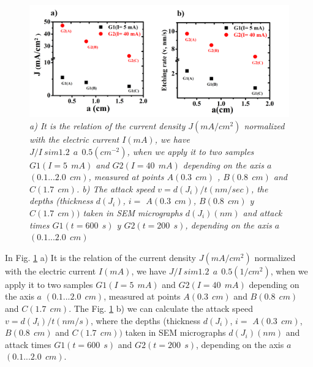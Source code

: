 \documentclass{article}
\begin{document}
 \begin{figure}
   \centering
   \includegraphics[scale=.7]{Images/grinJDR}
   \caption{\emph{a) It is the relation of the current density $
       J (mA / cm ^ 2) $ normalized with the electric current $ I
       (mA) $, we have $ J / I \ sim 1.2 \ \ a \ \ 0.5 ( cm^{-2})
       $, when we apply it to two samples $ G1 (I = 5 \ \ mA) $
       and $ G2 (I = 40 \ \ mA) $ depending on the axis $ a $ $
       (0.1 ... 2.0 \ \ cm) $, measured at points $ A (0.3 \ \
       cm) $ , $ B (0.8 \ \ cm) $ and $ C (1.7 \ \ cm) $. b) The
       attack speed $ v = d (J_i) / t (nm / sec) $, the depths
       (thickness $ d (J_i) $, $ i = $ $ A (0.3 \ \ cm) $, $ B (
       0.8 \ \ cm) $ y $ C (1.7 \ \ cm)) $ taken in SEM
       micrographs $ d (J_i) (nm) $ and attack times $ G1 (t =
       600 \ \ s) $ y $ G2 (t = 200 \ \ s) $, depending on the
       axis $ a $ $ (0.1 ... 2.0 \ \ cm) $ } }
   \label{fig:JDR}
 \end{figure}
In Fig. \ref{fig:JDR} a) It is the relation of the current density $ J
(mA / cm ^ 2) $ normalized with the electric current $ I (mA) $, we
have $ J / I \ sim 1.2 \ \ a \ \ 0.5 (1 / cm ^ 2) $, when we apply it
to two samples $ G1 (I = 5 \ \ mA) $ and $ G2 (I = 40 \ \ mA) $
depending on the axis $ a $ $ (0.1 ... 2.0 \ \ cm) $, measured at
points $ A (0.3 \ \ cm) $ and $ B (0.8 \ \ cm) $ and $ C (1.7 \ \ cm)
$.
The Fig. \ref{fig:JDR} b) we can calculate the attack speed $ v = d
(J_i) / t (nm / s) $, where the depths (thickness $ d (J_i) $, $ i = $
$ A (0.3 \ \ cm) $, $ B (0.8 \ \ cm) $ and $ C (1.7 \ \ cm)) $ taken
in SEM micrographs $ d (J_i) (nm) $ and attack times $ G1 (t = 600 \ \
s) $ and $ G2 (t = 200 \ \ s) $, depending on the axis $ a $ $ (0.1
... 2.0 \ \ cm) $.
\end{document}
